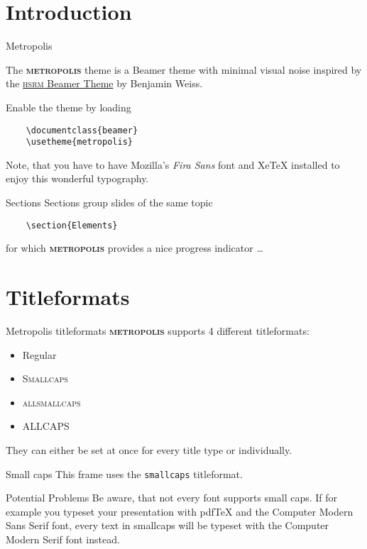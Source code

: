 \documentclass[10pt]{beamer}
\newcommand{\themename}{\textbf{\textsc{metropolis}}\xspace}
\begin{document}
\section{Introduction}
\begin{frame}[fragile]{Metropolis}

  The \themename theme is a Beamer theme with minimal visual noise
  inspired by the \href{https://github.com/hsrmbeamertheme/hsrmbeamertheme}{\textsc{hsrm} Beamer
  Theme} by Benjamin Weiss.

  Enable the theme by loading

  \begin{verbatim}    \documentclass{beamer}
    \usetheme{metropolis}\end{verbatim}

    Note, that you have to have Mozilla's \emph{Fira Sans} font and XeTeX
    installed to enjoy this wonderful typography.
  \end{frame}
  \begin{frame}[fragile]{Sections}
    Sections group slides of the same topic

    \begin{verbatim}    \section{Elements}\end{verbatim}

      for which \themename provides a nice progress indicator \ldots
    \end{frame}

    \section{Titleformats}

    \begin{frame}{Metropolis titleformats}
      \themename supports 4 different titleformats:
      \begin{itemize}
        \item Regular
        \item \textsc{Smallcaps}
        \item \textsc{allsmallcaps}
        \item ALLCAPS
      \end{itemize}
      They can either be set at once for every title type or individually.
    \end{frame}

    {
    \begin{frame}{Small caps}
      This frame uses the \texttt{smallcaps} titleformat.

      \begin{alertblock}{Potential Problems}
        Be aware, that not every font supports small caps. If for example you typeset your presentation with pdfTeX and the Computer Modern Sans Serif font, every text in smallcaps will be typeset with the Computer Modern Serif font instead.
      \end{alertblock}
    \end{frame}
    }
\end{document}
